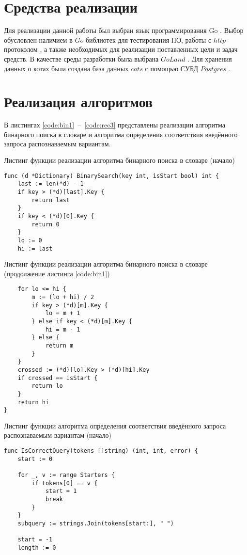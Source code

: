 \section{Средства реализации}
Для реализации данной работы был выбран язык программирования Go \cite{item1}. Выбор обусловлен наличием в $Go$ библиотек для тестирования ПО, работы с $http$ протоколом \cite{item7}, а также необходимых для реализации поставленных цели и задач средств. В качестве среды разработки была выбрана $GoLand$ \cite{item3}. Для хранения данных о котах была создана база данных $cats$ с помощью СУБД $Postgres$ \cite{item10}.

\section{Реализация алгоритмов}
В листингах \ref{code:bin1}~--~\ref{code:rec3} представлены реализации алгоритма бинарного поиска в словаре и алгоритма определения соответствия введённого запроса распознаваемым вариантам. 

\begin{code}
\caption{Листинг функции реализации алгоритма бинарного поиска в словаре (начало)}
\label{code:bin1}
\begin{verbatim}
func (d *Dictionary) BinarySearch(key int, isStart bool) int {
	last := len(*d) - 1
	if key > (*d)[last].Key {
		return last
	}
	if key < (*d)[0].Key {
		return 0
	}
	lo := 0
	hi := last
\end{verbatim}
\end{code}

\begin{code}
\caption{Листинг функции реализации алгоритма бинарного поиска в словаре (продолжение листинга \ref{code:bin1})}
\label{code:bin2}
\begin{verbatim}
	for lo <= hi {
		m := (lo + hi) / 2
		if key > (*d)[m].Key {
			lo = m + 1
		} else if key < (*d)[m].Key {
			hi = m - 1
		} else {
			return m
		}
	}
	crossed := (*d)[lo].Key > (*d)[hi].Key
	if crossed == isStart {
		return lo
	}
	return hi
}
\end{verbatim}
\end{code}

\begin{code}
\caption{Листинг функции алгоритма определения соответствия введённого запроса распознаваемым вариантам (начало)}
\label{code:rec1}
\begin{verbatim}
func IsCorrectQuery(tokens []string) (int, int, error) {
	start := 0

	for _, v := range Starters {
		if tokens[0] == v {
			start = 1
			break
		}
	}
	subquery := strings.Join(tokens[start:], " ")

	start = -1
	length := 0
\end{verbatim}
\end{code}

